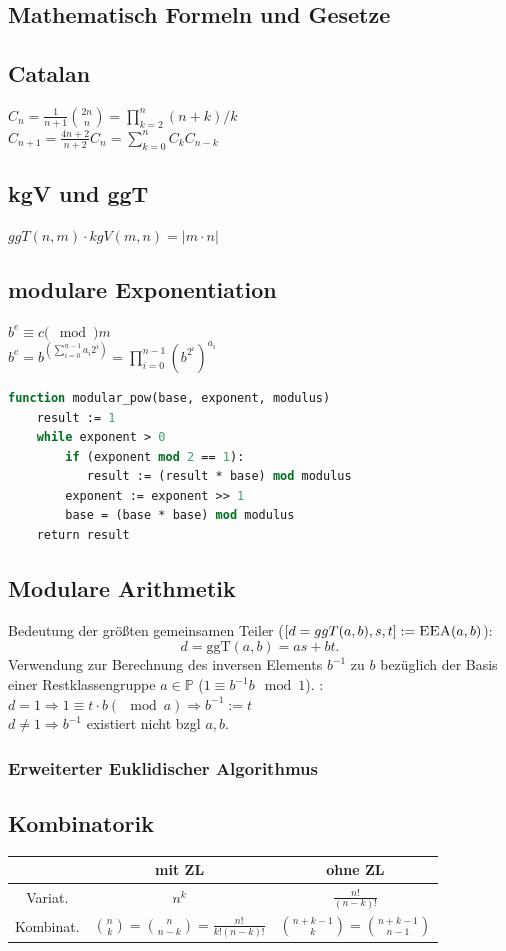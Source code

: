 \documentclass[10pt,a4paper,ngerman,oneside,]{article}
\begin{document}
\begin{multicols}{2}
\section{Mathematisch Formeln und Gesetze}
\subsection{Catalan}
$C_n = \frac1{n+1}\binom{2n}{n}=\prod_{k=2}^n (n+k)/k$\\
$C_{n+1} = \frac{4n+2}{n+2}C_n=\sum_{k=0}^{n}C_kC_{n-k}$
\subsection{kgV und ggT}
$ggT(n,m)\cdot kgV(m,n)=|m\cdot n|$
\subsection{modulare Exponentiation}
$b^e \equiv c (\mod) m$\\
$b^e = b^{\left( \sum_{i=0}^{n-1} a_i 2^i \right)} = \prod_{i=0}^{n-1} \left( b^{2^i} \right) ^ {a_i}$
\begin{lstlisting}[language=pascal]
function modular_pow(base, exponent, modulus)
    result := 1
    while exponent > 0
        if (exponent mod 2 == 1):
           result := (result * base) mod modulus
        exponent := exponent >> 1
        base = (base * base) mod modulus
    return result
\end{lstlisting}


\subsection{Modulare Arithmetik}
Bedeutung der größten gemeinsamen Teiler ($[d = ggT(a,b),s,t]:=\textsc{EEA}(a,b)$):
\[ d = \text{ggT}(a,b) = as+bt. \]
Verwendung zur Berechnung des inversen Elements $b^{-1}$ zu $b$ bezüglich der Basis einer Restklassengruppe $a\in\mathbb{P}$ ($1\equiv b^{-1}b \mod 1$). :\\
$d=1\Rightarrow 1\equiv t\cdot b (\mod a)\Rightarrow b^{-1}:=t$\\
$d\neq 1 \Rightarrow b^{-1}$ existiert nicht bzgl $a,b$.
\subsubsection{Erweiterter Euklidischer Algorithmus}
\subsection{Kombinatorik}
\begin{tabular}{|c||c|c|}\hline
 & mit ZL & ohne ZL\\\hline\hline
Variat. & $n^k$ & $\frac{n!}{(n-k)!}$\\\hline
Kombinat. & $\binom{n}{k}=\binom{n}{n-k}=\frac{n!}{k!(n-k)!}$ & $\binom{n+k-1}{k}=\binom{n+k-1}{n-1}$\\\hline
\end{tabular}

\end{multicols}
\end{document}

